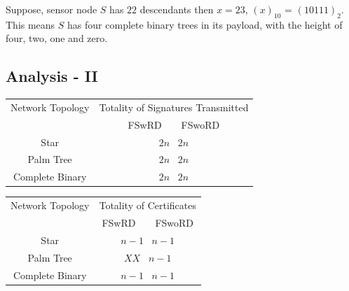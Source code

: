 \documentclass[%
  slidesonly,%
  semlayer%
  ]{seminar}                                  %
\begin{document}
\begin{slide}
        Suppose, sensor node $S$ has $22$ descendants then $x =23$, $(x)_{10}$ = $(10111)_{2}$. 
        This means $S$ has four complete binary trees in its payload, with the height of four, two, one and zero.
        \vfill
        \clearpage
    \subsection*{Analysis - II}
        \vfill
        \begin{tiny}
          \begin{table}
            \begin{center}
              \begin{tabular}{|c||c|}
                \hline
                Network Topology & Totality of Signatures Transmitted \\ 
                \cline{2-2}
                 & FSwRD \mbox{   } \vline \mbox{   } FSwoRD \\
                \hline
                \hline
                Star & $2n$ \vline \mbox{   }$2n$ \\
                \hline
                Palm Tree & $2n$ \vline \mbox{   }$2n$\\
                \hline
                Complete Binary & $2n$ \vline \mbox{   }$2n$\\
                \hline
              \end{tabular}
            \end{center}
          \end{table}

           \begin{table}
            \begin{center}
              \begin{tabular}{|c||c|}
                \hline
                Network Topology & Totality of Certificates \\ 
                \cline{2-2}
                 & FSwRD \mbox{   } \vline \mbox{   } FSwoRD \\
                \hline
                \hline
                Star & $n - 1$ \vline \mbox{   }$n -1$ \\
                \hline
                Palm Tree & $XX$ \vline \mbox{   }$n - 1$\\
                \hline
                Complete Binary & $n - 1$ \vline \mbox{   }$n - 1$\\
                \hline
              \end{tabular}
            \end{center}
          \end{table}
        \end{tiny}
        \vfill
        \clearpage 

\end{slide}
\end{document}
